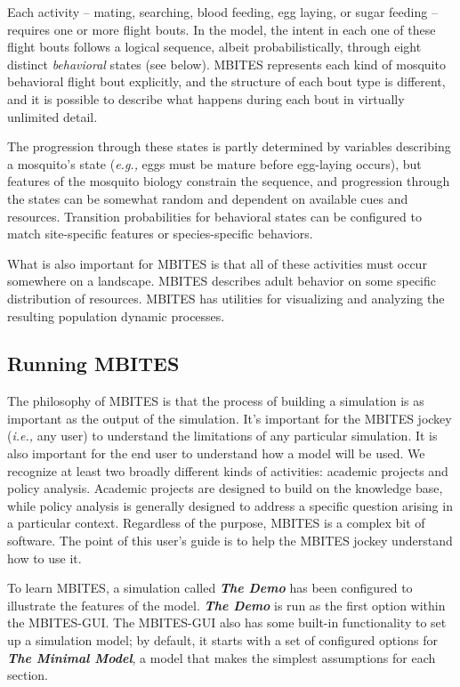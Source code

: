 \documentclass{article}
\newcommand{\eg}{{\em e.g., }}
\newcommand{\ie}{{\em i.e., }}
\newcommand{\demo}{{{\bf \em The Demo}}}
\newcommand{\minmod}{{{\bf \em The Minimal Model}}}
\begin{document}
Each activity -- mating, searching, blood feeding, egg laying, or sugar feeding -- requires one or more flight bouts. In the model, the intent in each one of these flight bouts follows a logical sequence, albeit probabilistically, through eight distinct {\em behavioral} states (see below). MBITES represents each kind of mosquito behavioral flight bout explicitly, and the structure of each bout type is different, and it is possible to describe what happens during each bout in virtually unlimited detail. 
 
The progression through these states is partly determined by variables describing a mosquito's state (\eg eggs must be mature before egg-laying occurs), but features of the mosquito biology constrain the sequence, and progression through the states can be somewhat random and dependent on available cues and resources. Transition probabilities for behavioral states can be configured to match site-specific features or species-specific behaviors.

What is also important for MBITES is that all of these activities must occur somewhere on a landscape. MBITES describes adult behavior on some specific distribution of resources. MBITES has utilities for visualizing and analyzing the resulting population dynamic processes.

\subsection{Running MBITES}

The philosophy of MBITES is that the process of building a simulation is as important as the output of the simulation. It's important for the MBITES jockey (\ie any user) to understand the limitations of any particular simulation. It is also important for the end user to understand how a model will be used. We recognize at least two broadly different kinds of activities: academic projects and policy analysis. Academic projects are designed to build on the knowledge base, while policy analysis is generally designed to address a specific question arising in a particular context. Regardless of the purpose, MBITES is a complex bit of software. The point of this user's guide is to help the MBITES jockey understand how to use it. 

To learn MBITES, a simulation called \demo\; has been configured to illustrate the features of the model. \demo\; is run as the first option within the MBITES-GUI. The MBITES-GUI also has some built-in functionality to set up a simulation model; by default, it starts with a set of configured options for \minmod, a model that makes the simplest assumptions for each section. 
\end{document}
